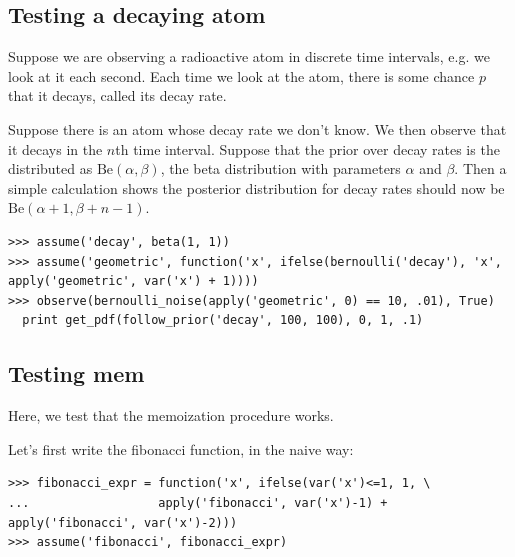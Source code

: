 \documentclass[11pt]{article}
\begin{document}
\subsection{Testing a decaying atom}

Suppose we are observing a radioactive atom in discrete time intervals, e.g. we look at it each second.  Each time we look at the atom, there is some chance $p$ that it decays, called its decay rate.  

Suppose there is an atom whose decay rate we don't know.  We then observe that it decays in the $n$th time interval.  Suppose that the prior over decay rates is the distributed as $\text{Be}(\alpha, \beta)$, the beta distribution with parameters $\alpha$ and $\beta$.  Then a simple calculation shows the posterior distribution for decay rates should now be $\text{Be}(\alpha + 1, \beta + n - 1)$. 

\begin{small}
\begin{verbatim}
>>> assume('decay', beta(1, 1)) 
>>> assume('geometric', function('x', ifelse(bernoulli('decay'), 'x', apply('geometric', var('x') + 1))))
>>> observe(bernoulli_noise(apply('geometric', 0) == 10, .01), True)
  print get_pdf(follow_prior('decay', 100, 100), 0, 1, .1) 
\end{verbatim}
\end{small}



\subsection{Testing mem}

Here, we test that the memoization procedure works.  

\noindent Let's first write the fibonacci function, in the naive way:

\begin{small}
\begin{verbatim}
>>> fibonacci_expr = function('x', ifelse(var('x')<=1, 1, \
...                  apply('fibonacci', var('x')-1) + apply('fibonacci', var('x')-2)))
>>> assume('fibonacci', fibonacci_expr)
\end{verbatim}
\end{small}
\end{document}

